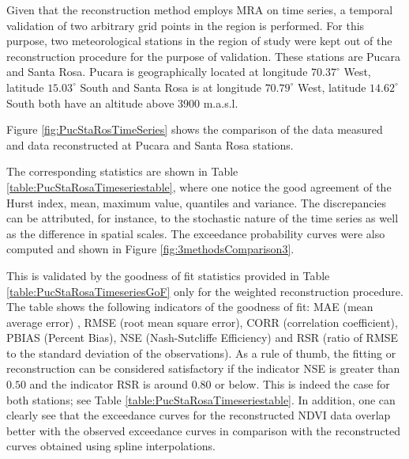 \documentclass[10pt,letterpaper,conference]{ieeeconf}
\begin{document}
Given that the reconstruction method employs MRA on time series, a temporal 
validation of two arbitrary grid points in the region is performed. For this 
purpose, two meteorological stations in the region of study were kept out of 
the reconstruction procedure for the purpose of validation. These stations are 
Pucara and Santa Rosa. Pucara is geographically located at longitude 
$70.37^\circ$ West, latitude $15.03^\circ$ South and Santa Rosa  is at 
longitude $70.79^\circ$ West, latitude $14.62^\circ$ South both have an altitude 
above $3900$ {m.a.s.l}.


Figure \ref{fig:PucStaRosTimeSeries} shows the comparison of the data measured 
and data reconstructed at Pucara and Santa Rosa stations. 


The corresponding statistics are shown in Table 
\ref{table:PucStaRosaTimeseriestable}, where one notice the good agreement of 
the Hurst index, mean, maximum value, quantiles and variance. The 
discrepancies can be attributed, for instance, to the stochastic nature of the 
time series as well as the difference in spatial scales. The exceedance 
probability curves were also computed and shown in Figure  
\ref{fig:3methodsComparison3}.

This is validated by the goodness of fit statistics provided in 
Table \ref{table:PucStaRosaTimeseriesGoF} only for the weighted reconstruction 
procedure. The table shows the following indicators of the goodness of 
fit: MAE (mean average error) , RMSE (root 
mean square error), CORR (correlation coefficient), PBIAS (Percent Bias), NSE 
(Nash-Sutcliffe Efficiency) and RSR (ratio of RMSE to the standard deviation of 
the observations). As a rule of thumb, the fitting or reconstruction can be 
considered satisfactory if the indicator NSE is greater than $0.50$ and the 
indicator RSR is around $0.80$ or below. This is indeed the case for both 
stations; see Table \ref{table:PucStaRosaTimeseriestable}. In addition, one 
can clearly see that the exceedance curves for the reconstructed NDVI data 
overlap better with the observed exceedance curves in comparison with the 
reconstructed curves obtained using spline interpolations. 
\end{document}
